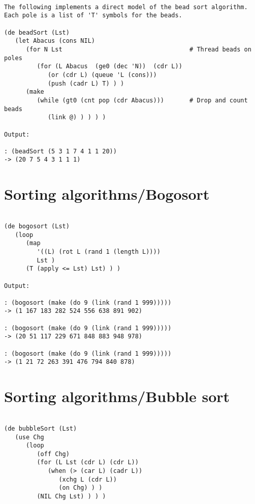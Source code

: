 \begin{verbatim}

The following implements a direct model of the bead sort algorithm.
Each pole is a list of 'T' symbols for the beads.

(de beadSort (Lst)
   (let Abacus (cons NIL)
      (for N Lst                                   # Thread beads on poles
         (for (L Abacus  (ge0 (dec 'N))  (cdr L))
            (or (cdr L) (queue 'L (cons)))
            (push (cadr L) T) ) )
      (make
         (while (gt0 (cnt pop (cdr Abacus)))       # Drop and count beads
            (link @) ) ) ) )

Output:

: (beadSort (5 3 1 7 4 1 1 20))
-> (20 7 5 4 3 1 1 1)

\end{verbatim}

\section*{Sorting algorithms/Bogosort}

\begin{verbatim}

(de bogosort (Lst)
   (loop
      (map
         '((L) (rot L (rand 1 (length L))))
         Lst )
      (T (apply <= Lst) Lst) ) )

Output:

: (bogosort (make (do 9 (link (rand 1 999)))))
-> (1 167 183 282 524 556 638 891 902)

: (bogosort (make (do 9 (link (rand 1 999)))))
-> (20 51 117 229 671 848 883 948 978)

: (bogosort (make (do 9 (link (rand 1 999)))))
-> (1 21 72 263 391 476 794 840 878)

\end{verbatim}

\section*{Sorting algorithms/Bubble sort}

\begin{verbatim}

(de bubbleSort (Lst)
   (use Chg
      (loop
         (off Chg)
         (for (L Lst (cdr L) (cdr L))
            (when (> (car L) (cadr L))
               (xchg L (cdr L))
               (on Chg) ) )
         (NIL Chg Lst) ) ) )

\end{verbatim}

